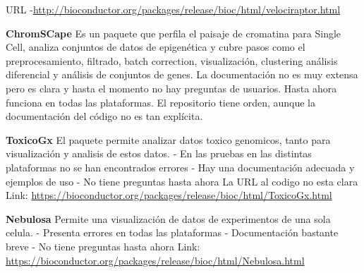 \documentclass[
]{article}
\begin{document}
URL
-\url{http://bioconductor.org/packages/release/bioc/html/velociraptor.html}

\textbf{ChromSCape} Es un paquete que perfila el paisaje de cromatina
para Single Cell, analiza conjuntos de datos de epigenética y cubre
pasos como el preprocesamiento, filtrado, batch correction,
visualización, clustering análisis diferencial y análisis de conjuntos
de genes. La documentación no es muy extensa pero es clara y hasta el
momento no hay preguntas de usuarios. Hasta ahora funciona en todas las
plataformas. El repositorio tiene orden, aunque la documentación del
código no es tan explícita.

\textbf{ToxicoGx} El paquete permite analizar datos toxico genomicos,
tanto para visualización y analisis de estos datos. - En las pruebas en
las distintas plataformas no se han encontrados errores - Hay una
documentación adecuada y ejemplos de uso - No tiene preguntas hasta
ahora La URL al codigo no esta clara Link:
\url{https://bioconductor.org/packages/release/bioc/html/ToxicoGx.html}

\textbf{Nebulosa} Permite una visualización de datos de experimentos de
una sola celula. - Presenta errores en todas las plataformas -
Documentación bastante breve - No tiene preguntas hasta ahora Link:
\url{https://bioconductor.org/packages/release/bioc/html/Nebulosa.html}
\end{document}
